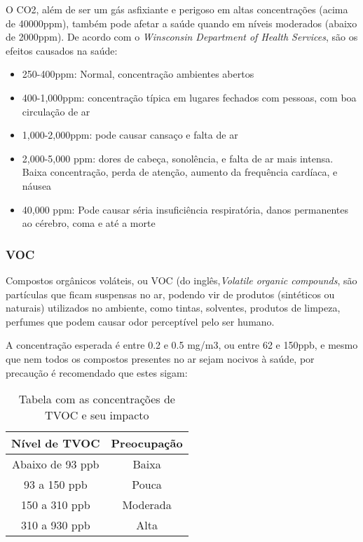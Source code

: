 \documentclass[../monografia.tex]{subfiles}
\begin{document}
O CO2, além de ser um gás asfixiante e perigoso em altas concentrações (acima de 40000ppm), também pode afetar a saúde quando em níveis moderados (abaixo de 2000ppm). 
De acordo com o \textit{Winsconsin Department of Health Services}\cite{Winsconsin}, são os efeitos causados na saúde: 
\begin{itemize}
\item 250-400ppm: Normal, concentração ambientes abertos
\item 400-1,000ppm: concentração típica em lugares fechados com pessoas, com boa circulação de ar
\item 1,000-2,000ppm: pode causar cansaço e falta de ar
\item 2,000-5,000 ppm: dores de cabeça, sonolência, e falta de ar mais intensa. Baixa concentração, perda de atenção, aumento da frequência cardíaca, e náusea
\item 40,000 ppm: Pode causar séria insuficiência respiratória, danos permanentes ao cérebro, coma e até a morte
\end{itemize}

\subsubsection{VOC}
Compostos orgânicos voláteis, ou VOC (do inglês,\textit{Volatile organic compounds}, são partículas que ficam suspensas no ar, podendo vir de produtos (sintéticos ou naturais) utilizados no ambiente, como tintas, solventes, produtos de limpeza, perfumes que podem causar odor perceptível pelo ser humano\cite{AirQuality}.

A concentração esperada é entre 0.2 e 0.5 mg/m3, ou entre 62 e 150ppb, e mesmo que nem todos os compostos presentes no ar sejam nocivos à saúde, por precaução é recomendado que estes sigam: \cite{tecam}

\begin{table}[h]
\centering
\begin{tabular}{ |c|c| }
\hline
Nível de TVOC	&   Preocupação \\
\hline
Abaixo de 93 ppb  &  Baixa \\
93 a 150 ppb  &   Pouca \\
150 a 310 ppb &  Moderada \\
310 a 930 ppb &  Alta \\
\hline
\end{tabular}
\caption{Tabela com as concentrações de TVOC e seu impacto }
\label{table}
\end{table}
\end{document}
